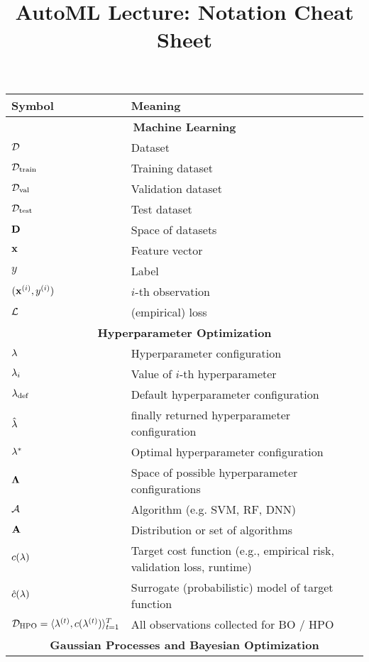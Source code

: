 \documentclass[]{report}
\title{AutoML Lecture: Notation Cheat Sheet}
\author{}
\date{}
\begin{document}
\maketitle

\begin{table}
	\begin{tabular}{ll}
		\toprule
		Symbol & Meaning \\
		\midrule
		\multicolumn{2}{c}{\textbf{Machine Learning}}\\
     	$\mathcal{D}$ & Dataset\\
     	$\mathcal{D}_{\text{train}}$ & Training dataset\\
	   	$\mathcal{D}_{\text{val}}$ & Validation dataset\\     	
     	$\mathcal{D}_{\text{test}}$ & Test dataset\\     	
		$\mathbf{D}$ & Space of datasets\\
     	$\mathbf{x}$ & Feature vector \\
     	$y$ & Label \\
     	$(\mathbf{x}^{(i)},y^{(i)})$ & $i$-th observation\\
		$\mathcal{L}$ & (empirical) loss\\     	
		\midrule
		\multicolumn{2}{c}{\textbf{Hyperparameter Optimization}}\\
		$\mathbf{\lambda}$ & Hyperparameter configuration\\
		$\mathbf{\lambda}_i$ & Value of $i$-th hyperparameter \\
		$\mathbf{\lambda}_{\text{def}}$ & Default hyperparameter configuration\\
		$\hat{\mathbf{\lambda}}$ & finally returned hyperparameter configuration\\
		$\mathbf{\lambda}^*$ & Optimal hyperparameter configuration\\
		$\mathbf{\Lambda}$ &  Space of possible hyperparameter configurations\\
		$\mathcal{A}$ & Algorithm (e.g. SVM, RF, DNN) \\
		$\mathbf{A}$ & Distribution or set of algorithms\\
		$c(\mathbf{\lambda})$ & Target cost function (e.g., empirical risk, validation loss, runtime)\\		
		$\hat{c}(\mathbf{\lambda})$ & Surrogate (probabilistic) model of target function\\		
		$\mathcal{D}_{\text{HPO}} = \langle \mathbf{\lambda}^{(t)}, c(\mathbf{\lambda}^{(t)}) \rangle_{t=1}^T$ &  All observations collected for BO / HPO\\
		\midrule 
		\multicolumn{2}{c}{\textbf{Gaussian Processes and Bayesian Optimization}}\\

\end{tabular}
\end{table}
\end{document}
